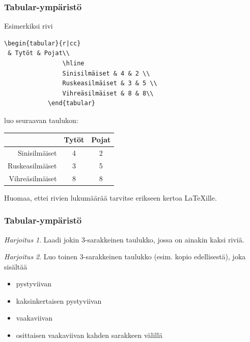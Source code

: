 \documentclass[handout,hyperref={colorlinks=true}]{beamer}
\theoremstyle{remark}
\newtheorem{harj}{Harjoitus}[section]
\begin{document}
\begin{frame}[fragile]
    \frametitle{Tabular-ympäristö}
    Esimerkiksi rivi
    \begin{scriptsize}
        \begin{Verbatim}[frame=single]
                \begin{tabular}{r|cc}
 & Tytöt & Pojat\\
                \hline
                Sinisilmäiset & 4 & 2 \\
                Ruskeasilmäiset & 3 & 5 \\
                Vihreäsilmäiset & 8 & 8\\
            \end{tabular}
        \end{Verbatim}
    \end{scriptsize}
    luo seuraavan taulukon:
    \begin{framed} 
        \begin{tabular}{r|cc}
            & Tytöt & Pojat\\
            \hline
            Sinisilmäiset & 4 & 2 \\
            Ruskeasilmäiset & 3 & 5 \\
            Vihreäsilmäiset & 8 & 8\\
        \end{tabular}
    \end{framed}
    Huomaa, ettei rivien lukumäärää tarvitse erikseen kertoa \LaTeX ille.

\end{frame}



\begin{frame}[fragile]
    \frametitle{Tabular-ympäristö}
    \begin{harj}
        Laadi jokin 3-sarakkeinen taulukko, jossa on ainakin kaksi riviä.  
    \end{harj}
    \begin{harj}
        Luo toinen 3-sarakkeinen taulukko (esim. kopio edellisestä), joka sisältää 
        \begin{itemize}
            \item pystyviivan
            \item kaksinkertaisen pystyviivan
            \item vaakaviivan
            \item osittaisen vaakaviivan kahden sarakkeen välillä
        \end{itemize}
    \end{harj}
\end{frame}
\end{document}
